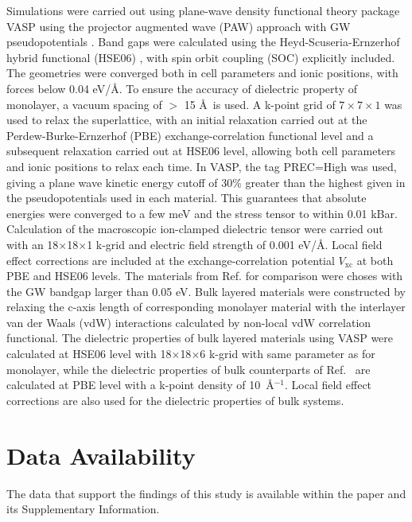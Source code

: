 \documentclass[journal=ancac3,manuscript=article,email=true,hyperref=true,keywords=false]{achemso}
\begin{document}
Simulations were carried out using plane-wave density functional
theory package VASP \cite{Kresse_1993,Kresse_1996_1,Kresse_1996_2}
using the projector augmented wave (PAW) approach with GW
pseudopotentials \cite{Kresse_1999_pseudopotentials}. Band gaps were
calculated using the Heyd-Scuseria-Ernzerhof hybrid functional (HSE06)
\cite{Heyd_2003,HSE_2006}, with spin orbit coupling (SOC) explicitly
included. The geometries were converged both in cell parameters and
ionic positions, with forces below 0.04 eV/\AA. To ensure the accuracy
of dielectric property of monolayer, a vacuum spacing of $>$ 15 \AA~is
used. A k-point grid of \(7\times7\times1\) was used to relax the
superlattice, with an initial relaxation carried out at the
Perdew-Burke-Ernzerhof
(PBE)\cite{Perdew_1996,Ernzerhof_1999,Paier_2005_PBE}
exchange-correlation functional level and a subsequent relaxation
carried out at HSE06 level, allowing both cell parameters and ionic
positions to relax each time. In VASP, the tag PREC=High was used,
giving a plane wave kinetic energy cutoff of 30\% greater than the
highest given in the pseudopotentials used in each material. This
guarantees that absolute energies were converged to a few meV and the
stress tensor to within 0.01 kBar.  Calculation of the macroscopic
ion-clamped dielectric tensor were carried out with an
18$\times$18$\times$1 k-grid and electric field strength of 0.001
eV/\AA.  Local field effect corrections are included at the
exchange-correlation potential $V_{\mathrm{xc}}$ at both PBE and HSE06
levels. The materials from Ref. for comparison
were choses with the GW bandgap larger than 0.05 eV. Bulk layered
materials were constructed by relaxing the c-axis length of
corresponding monolayer material with the interlayer van der Waals
(vdW) interactions calculated by non-local vdW correlation
functional\cite{Lee_2010_vdFD2}.  The dielectric properties of bulk
layered materials using VASP were calculated at HSE06 level with
18$\times$18$\times$6 k-grid with same parameter as for monolayer,
while the dielectric properties of bulk counterparts of
Ref.~ are calculated at PBE level with a
k-point density of 10~\AA$^{-1}$. Local field effect corrections are
also used for the dielectric properties of bulk systems.



\section*{Data Availability}
The data that support the findings of this study 
is available within the paper and its Supplementary Information.  
\end{document}
